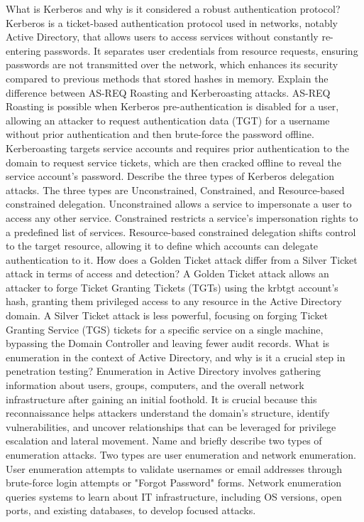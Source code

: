 What is Kerberos and why is it considered a robust authentication protocol? Kerberos is a ticket-based authentication protocol used in networks, notably Active Directory, that allows users to access services without constantly re-entering passwords. It separates user credentials from resource requests, ensuring passwords are not transmitted over the network, which enhances its security compared to previous methods that stored hashes in memory.
Explain the difference between AS-REQ Roasting and Kerberoasting attacks. AS-REQ Roasting is possible when Kerberos pre-authentication is disabled for a user, allowing an attacker to request authentication data (TGT) for a username without prior authentication and then brute-force the password offline. Kerberoasting targets service accounts and requires prior authentication to the domain to request service tickets, which are then cracked offline to reveal the service account's password.
Describe the three types of Kerberos delegation attacks. The three types are Unconstrained, Constrained, and Resource-based constrained delegation. Unconstrained allows a service to impersonate a user to access any other service. Constrained restricts a service's impersonation rights to a predefined list of services. Resource-based constrained delegation shifts control to the target resource, allowing it to define which accounts can delegate authentication to it.
How does a Golden Ticket attack differ from a Silver Ticket attack in terms of access and detection? A Golden Ticket attack allows an attacker to forge Ticket Granting Tickets (TGTs) using the krbtgt account's hash, granting them privileged access to any resource in the Active Directory domain. A Silver Ticket attack is less powerful, focusing on forging Ticket Granting Service (TGS) tickets for a specific service on a single machine, bypassing the Domain Controller and leaving fewer audit records.
What is enumeration in the context of Active Directory, and why is it a crucial step in penetration testing? Enumeration in Active Directory involves gathering information about users, groups, computers, and the overall network infrastructure after gaining an initial foothold. It is crucial because this reconnaissance helps attackers understand the domain's structure, identify vulnerabilities, and uncover relationships that can be leveraged for privilege escalation and lateral movement.
Name and briefly describe two types of enumeration attacks. Two types are user enumeration and network enumeration. User enumeration attempts to validate usernames or email addresses through brute-force login attempts or "Forgot Password" forms. Network enumeration queries systems to learn about IT infrastructure, including OS versions, open ports, and existing databases, to develop focused attacks.
